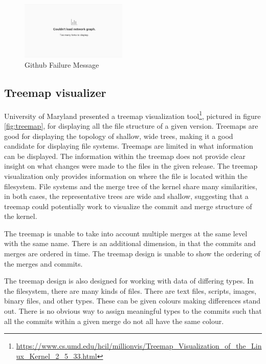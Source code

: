 \documentclass[conference, draftclsnofoot]{IEEEtran}
\begin{document}
\begin{figure}[h!]
	\centering
	\includegraphics[width=0.45\textwidth]{figures/github_viewer.png}
	\caption{Github Failure Message}
	\label{fig:gitfail}
\end{figure}


\subsection{Treemap visualizer}
University of Maryland presented a treemap visualization
tool\footnote{\url{https://www.cs.umd.edu/hcil/millionvis/Treemap_Visualization_of_the_Linux_Kernel_2_5_33.html}},
pictured in figure \ref{fig:treemap}, for
displaying all the file structure of a given version. Treemaps are good for
displaying the topology of shallow, wide trees, making it a good candidate for
displaying file systems. Treemaps are limited in what information can be
displayed. The information within the treemap does not provide clear insight on
what changes were made to the files in the given release. The treemap
visualization only provides information on where the file is located within the
filesystem. File systems and the merge tree of the kernel share many
similarities, in both cases, the representative trees are wide and shallow,
suggesting that a treemap could potentially work to visualize the commit and
merge structure of the kernel.

The treemap is unable to take into account multiple merges at the same level
with the same name. There is an additional dimension, in that the commits and
merges are ordered in time. The treemap design is unable to show the ordering
of the merges and commits.

The treemap design is also designed for working with data of differing types.
In the filesystem, there are many kinds of files.  There are text files,
scripts, images, binary files, and other types. These can be given colours
making differences stand out. There is no obvious way to assign meaningful
types to the commits such that all the commits within a given merge do not all
have the same colour.
\end{document}
